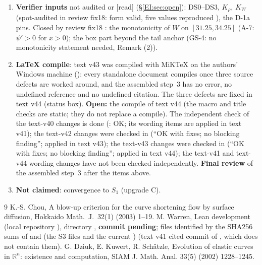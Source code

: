 \documentclass[11pt]{article}
\begin{document}
\begin{enumerate}[leftmargin=*]
\item \textbf{Verifier inputs} not audited or [read] (\S\ref{EI:sec:open}): DS0--DS3, $K_\rho$, $K_W$ (spot-audited in review fix18: form valid, five values reproduced \tHd), the D-1a pins. Closed by review fix18 \tHd: the monotonicity of $W$ on $[31.25,34.25]$ (A-7: $\psi'>0$ for $x>0$); the box part beyond the tail anchor (GS-4: no monotonicity statement needed,  Remark (2)).
\item \textbf{LaTeX compile}: text v43 was compiled with MiKTeX on the authors' Windows machine (): every standalone document compiles once three source defects are worked around, and the assembled step~3 has no error, no undefined reference and no undefined citation. The three defects are fixed in text v44 (status box). \textbf{Open:} the compile of text v44 (the macro and title checks are static; they do not replace a compile). The independent check of the text-v40 changes is done (: OK; its wording items are applied in text v41); the text-v42 changes were checked in  (``OK with fixes; no blocking finding''; applied in text v43); the text-v43 changes were checked in  (``OK with fixes; no blocking finding''; applied in text v44); the text-v41 and text-v44 wording changes have not been checked independently. \textbf{Final review} of the assembled step~3 after the items above.
\item \textbf{Not claimed}: convergence to $S_1$ (upgrade C).
\end{enumerate}

\begin{thebibliography}{9}
 K.-S. Chou, A blow-up criterion for the curve shortening flow by surface diffusion, Hokkaido Math.\ J.\ 32(1) (2003) 1--19.
 M. Warren, Lean development  (local repository ), directory , \textbf{commit pending}; files identified by the SHA256 sums of  and  (the S3 files and the current ) (text v41 cited commit  of , which does not contain them).
 G. Dziuk, E. Kuwert, R. Sch{\"a}tzle, Evolution of elastic curves in $\mathbb R^n$: existence and computation, SIAM J. Math. Anal. 33(5) (2002) 1228--1245.
\end{thebibliography}
\end{document}
